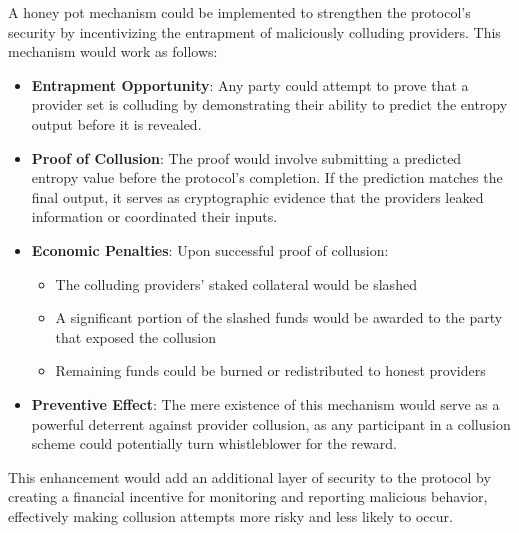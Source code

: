 A honey pot mechanism could be implemented to strengthen the protocol's security by incentivizing the entrapment of maliciously colluding providers. This mechanism would work as follows:

\begin{itemize}
    \item \textbf{Entrapment Opportunity}: Any party could attempt to prove that a provider set is colluding by demonstrating their ability to predict the entropy output before it is revealed.
    
    \item \textbf{Proof of Collusion}: The proof would involve submitting a predicted entropy value before the protocol's completion. If the prediction matches the final output, it serves as cryptographic evidence that the providers leaked information or coordinated their inputs.
    
    \item \textbf{Economic Penalties}: Upon successful proof of collusion:
    \begin{itemize}
        \item The colluding providers' staked collateral would be slashed
        \item A significant portion of the slashed funds would be awarded to the party that exposed the collusion
        \item Remaining funds could be burned or redistributed to honest providers
    \end{itemize}
    
    \item \textbf{Preventive Effect}: The mere existence of this mechanism would serve as a powerful deterrent against provider collusion, as any participant in a collusion scheme could potentially turn whistleblower for the reward.
\end{itemize}

This enhancement would add an additional layer of security to the protocol by creating a financial incentive for monitoring and reporting malicious behavior, effectively making collusion attempts more risky and less likely to occur.
